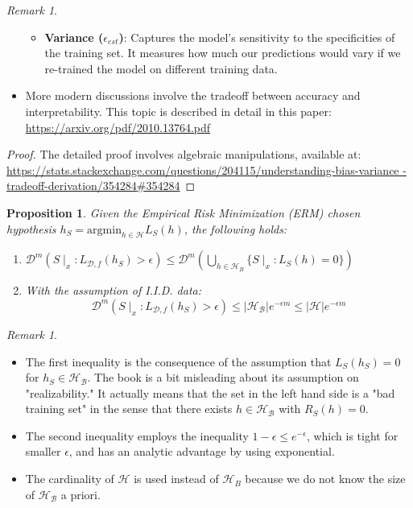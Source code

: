 \documentclass{article}
\newtheorem{proposition}[theorem]{Proposition}
\theoremstyle{remark}
\newtheorem{remark}[example]{Remark}
\begin{document}
\begin{remark}
\begin{itemize}
\begin{itemize}
        \item \textbf{Variance ($\epsilon_{est}$)}: Captures the model's sensitivity to the specificities of the training set. It measures how much our predictions would vary if we re-trained the model on different training data.
    \end{itemize}
    
    \item More modern discussions involve the tradeoff between accuracy and interpretability. This topic is described in detail in this paper: \url{https://arxiv.org/pdf/2010.13764.pdf}
\end{itemize}
\end{remark}

\begin{proof}
The detailed proof involves algebraic manipulations, available at:
\url{https://stats.stackexchange.com/questions/204115/understanding-bias-variance
-tradeoff-derivation/354284#354284}
\end{proof}

\begin{proposition}
Given the Empirical Risk Minimization (ERM) chosen hypothesis $h_S = \text{argmin}_{h\in\mathcal{H}}L_{S}(h)$, the following holds:
\begin{enumerate}
    \item $\mathcal{D}^m\left(S\mid_x:L_{\mathcal{D}, f}(h_S)>\epsilon\right) \leq \mathcal{D}^m\left(\bigcup_{h\in \mathcal{H}_B}\{S\mid_x:L_S(h)=0\}\right)$
    
    \item With the assumption of I.I.D. data:
    \[\mathcal{D}^m\left(S\mid_x:L_{\mathcal{D}, f}(h_S)>\epsilon\right) \leq \lvert \mathcal{H_B}\rvert e^{-\epsilon m} \leq \lvert \mathcal{H}\rvert e^{-\epsilon m}\]
\end{enumerate}
\end{proposition}

\begin{remark}
\begin{itemize}
\item The first inequality is the consequence of the assumption that $L_S(h_S)=0$ for $h_S\in \mathcal{H}_\mathcal{B}$. The book is a bit misleading about its assumption on "realizability." It actually means that the set in the left hand side is a "bad training set" in the sense that there exists $h\in \mathcal{H}_\mathcal{B}$ with $R_S(h)=0$.
\item The second inequality employs the inequality $1-\epsilon \leq e^{-\epsilon}$, which is tight for smaller $\epsilon$, and has an analytic advantage by using exponential.
\item The cardinality of $\mathcal{H}$ is used instead of $\mathcal{H}_B$ because we do not know the size of $\mathcal{H_B}$ a priori.
\end{itemize}
\end{remark}
\end{document}
